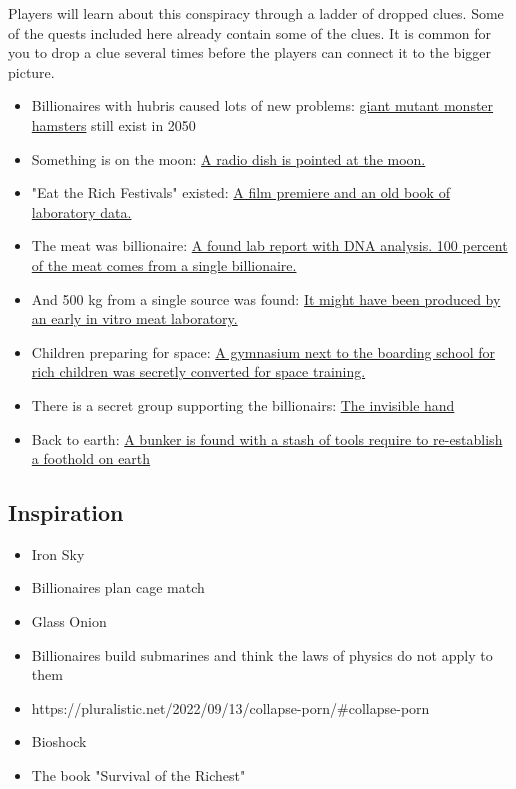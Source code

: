 Players will learn about this conspiracy through a ladder of dropped clues. Some of the quests included here already contain some of the clues. It is common for you to drop a clue several times before the players can connect it to the bigger picture.

\begin{itemize}
    \item Billionaires with hubris caused lots of new problems: \hyperref[ch:the world destroying machine]{giant mutant monster hamsters} still exist in 2050
    \item Something is on the moon: \hyperref[ch:project lifeguard]{A radio dish is pointed at the moon.}
    \item "Eat the Rich Festivals" existed: \hyperref[ch:the name of the rose]{A film premiere and an old book of laboratory data.}
    \item The meat was billionaire: \hyperref[ch:the name of the rose]{A found lab report with DNA analysis. 100 percent of the meat comes from a single billionaire.}
    \item And 500 kg from a single source was found: \hyperref[ch:the name of the rose]{It might have been produced by an early in vitro meat laboratory.}
    \item Children preparing for space: \hyperref[ch:settlers]{A gymnasium next to the boarding school for rich children was secretly converted for space training.}
    \item There is a secret group supporting the billionairs: \hyperref[ch:the name of the rose]{The invisible hand}
    \item Back to earth: \hyperref[ch:To the moon]{A bunker is found with a stash of tools require to re-establish a foothold on earth}
\end{itemize}


\subsection{Inspiration}

\begin{itemize}
    \item Iron Sky
    \item Billionaires plan cage match
    \item Glass Onion
    \item Billionaires build submarines and think the laws of physics do not apply to them
    \item https://pluralistic.net/2022/09/13/collapse-porn/#collapse-porn
    \item Bioshock
    \item The book "Survival of the Richest"
\end{itemize}

